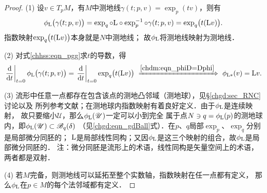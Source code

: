 \begin{proof}
    (1)  设$v\in T_pM$，有$M$中测地线$\gamma(t;p,v)=\exp_p(tv)$，则有
    \begin{equation}\label{chhss:eqn_pgg}
         \phi_{\rm L}\bigl( \gamma(t;p,v) \bigr) = \exp_q \circ {\rm L}\circ \exp^{-1}_p \circ \gamma(t;p,v)
         =\exp_q \bigl(t ({\rm L} v)\bigr) . %
    \end{equation}
    指数映射$\exp_q \bigl(t ({\rm L} v)\bigr)$本身就是$N$中测地线；
    故$\phi_{\rm L}$将测地线映射为测地线．
    
    (2) 对式\eqref{chhss:eqn_pgg}求$t$的导数，得
    \begin{equation}
        \left.\frac{\rm d}{{\rm d}t}\right|_{t=0} \phi_{\rm L}\bigl( \gamma(t;p,v) \bigr) 
        = \left.\frac{\rm d}{{\rm d}t}\right|_{t=0} \exp_q \bigl(t ({\rm L} v)\bigr)
        \ \xRightarrow{\ref{chdm:eqn_phiD=Dphi}} \ 
        \phi_{{\rm L}*} (v) = {\rm L}v .
    \end{equation}
        
    
    (3) 流形中任意一点都存在包含该点的测地凸邻域（测地球），见\S\ref{chgd:sec_RNC}讨论以及
    所列参考文献；在测地球内指数映射有着良好定义．由于$\phi_{\rm L}$是连续映射，
    故只要缩小$\mathscr{U}$，那么$\phi_{\rm L}(\mathscr{U})$一定可以小到完全
    属于点$N\ni q = \phi_{\rm L}(p)$的测地球内，即$\phi_{\rm L}(\mathscr{U})\subset \mathscr{B}_q(\delta)$
    （见\eqref{chgd:eqn_gdBall}式）．在$p$、$q$局部$\exp_p$、$\exp_q$分别是局部微分同胚的；
    $\rm L$是局部线性同构；又因$\phi_{\rm L}$是这三个映射的组合，故$\phi_{\rm L}$是局部微分同胚的．
    注：微分同胚是流形上的术语，线性同构是矢量空间上的术语，两者都是双射．
    
    (4) 若$M$完备，则测地线可以延拓至整个实数轴，指数映射在任一点都有定义，
    那么$\phi_{\rm L}$在$p\in M$的每个法邻域都有定义．
\end{proof}




